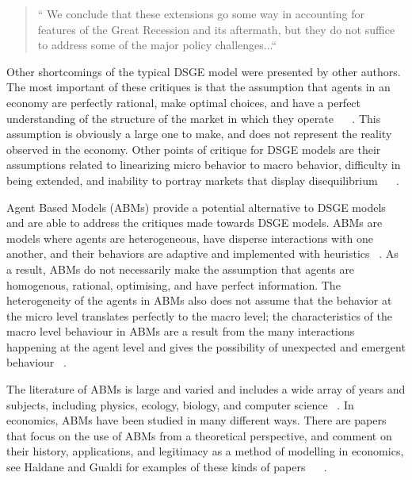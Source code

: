 \documentclass[11pt]{article}
\begin{document}
\begin{quote}
`` We conclude that these extensions go some way in accounting for features of
the Great Recession and its aftermath, but they do not suffice to address some of
the major policy challenges...``
\end{quote}

Other shortcomings of the typical DSGE model were presented by other authors.
The most important of these critiques is that the assumption that agents in an
economy are perfectly rational, make optimal choices, and have a perfect understanding
of the structure of the market in which they operate ~\cite{Haldane-history-paper} ~\cite{Gualdi-tipping-paper}.
This assumption is obviously a large one to make, and does not represent the
reality observed in the economy. Other points of critique for DSGE models are
their assumptions related to linearizing micro behavior to macro behavior,
difficulty in being extended, and inability to portray markets that display
disequilibrium ~\cite{Haldane-history-paper} ~\cite{Gualdi-tipping-paper}.

Agent Based Models (ABMs) provide a potential alternative to DSGE models and
are able to address the critiques made towards DSGE models. ABMs are models
where agents are heterogeneous, have disperse interactions with one another,
 and their behaviors are adaptive and implemented with heuristics ~\cite{Haldane-history-paper}.
 As a result, ABMs do not necessarily make the assumption that agents are
 homogenous, rational, optimising, and have perfect information. The heterogeneity
 of the agents in ABMs also does not assume that the behavior at the micro level
 translates perfectly to the macro level; the characteristics of the macro level
 behaviour in ABMs are a result from the many interactions happening at the agent
 level and gives the possibility of unexpected and emergent behaviour ~\cite{Haldane-history-paper}.

The literature of ABMs is large and varied and includes a wide array of years and
subjects, including physics, ecology, biology, and computer science ~\cite{Haldane-history-paper}.
In economics, ABMs have been studied in many different ways. There are papers that
focus on the use of ABMs from a theoretical perspective, and comment on their history,
applications, and legitimacy as a method of modelling in economics, see Haldane and
Gualdi for examples of these kinds of papers ~\cite{Haldane-history-paper} ~\cite{Gualdi-tipping-paper}.
\end{document}
